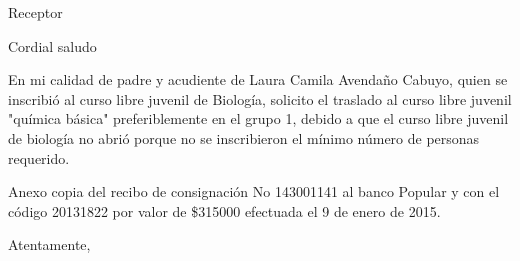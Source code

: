 \documentclass[letterpaper,spanish,11pt]{letter}
\begin{document}
\begin{letter}{Receptor}
	
\opening{Cordial saludo}
En mi calidad de padre y acudiente de Laura Camila Avendaño Cabuyo, quien se inscribió al curso libre juvenil de Biología, solicito el traslado al curso libre juvenil "química básica" preferiblemente en el grupo 1, debido a que el curso libre juvenil de biología no abrió porque no se inscribieron el mínimo número de personas requerido.

Anexo copia del recibo de consignación No 143001141 al banco Popular y con el código 20131822 por valor de \$315000 efectuada el 9 de enero de 2015.
\closing{Atentamente,}


\end{letter}
\end{document}

